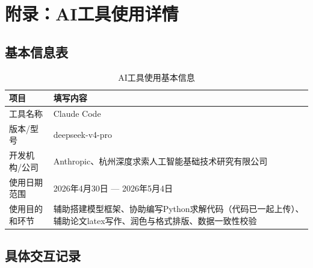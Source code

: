 \section{附录：AI工具使用详情}

\subsection{基本信息表}

\begin{table}[!h]
    \centering
    \begin{tabular}{lp{10cm}}
        \toprule[1.5pt]
        项目 & 填写内容 \\
        \midrule[1pt]
        工具名称 & Claude Code \\
        \midrule
        版本/型号 & deepseek-v4-pro\\
        \midrule
        开发机构/公司 & Anthropic、杭州深度求索人工智能基础技术研究有限公司 \\
        \midrule
        使用日期范围 & 2026年4月30日 — 2026年5月4日 \\
        \midrule
        使用目的和环节 & 辅助搭建模型框架、协助编写Python求解代码（代码已一起上传）、辅助论文latex写作、润色与格式排版、数据一致性校验 \\
        \bottomrule[1.5pt]
    \end{tabular}
    \caption{AI工具使用基本信息}
    \label{tab:ai-basic}
\end{table}

\subsection{具体交互记录}

